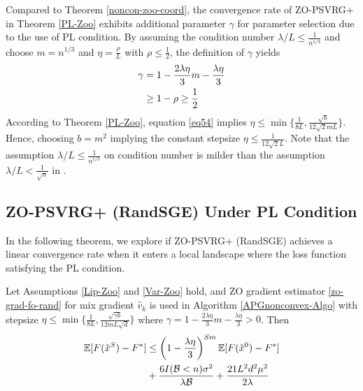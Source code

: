 \begin{remark}
Compared to Theorem \ref{noncon-zoo-coord}, the convergence rate of ZO-PSVRG+ in Theorem \ref{PL-Zoo} exhibits additional parameter $\gamma$ for parameter selection due to the use of PL condition. 
By assuming the condition number $\lambda/L\leq \frac{1}{n^{1/3}}$ and choose $m = n^{1/3}$ and $\eta = \frac{\rho}{L}$ with $\rho\leq \frac{1}{2}$, the definition of $\gamma$ yields  
\begin{align}
\gamma &= 1-\frac{2\lambda\eta}{3} m-\frac{\lambda\eta}{3}\notag \\
& \geq  1 - \rho \geq \frac{1}{2}\label{eq54}
\end{align}
According to Theorem \ref{PL-Zoo}, equation \eqref{eq54} implies $\eta \leq \min\{\frac{1}{8L}, \frac{\sqrt{b}}{12\sqrt{2} m L }\}$. 
Hence, choosing $b = m^{2}$ implying the constant stepsize  $\eta \leq \frac{1}{12\sqrt{2} L}$.
Note that the assumption $\lambda/L \leq \frac{1}{{n}^{1/3}}$ on condition number is milder than the assumption $\lambda/L < \frac{1}{\sqrt{n}}$ in \cite{reddi2016proximal}.
\end{remark}
\subsection{ZO-PSVRG+ (RandSGE) Under PL Condition}
In the following theorem, we explore if ZO-PSVRG+ (RandSGE) achieves a linear convergence rate when it enters a local landscape where the loss function satisfying the PL condition.
\begin{theorem}\label{PL-Zoo-rand}
Let Assumptions \ref{Lip-Zoo} and \ref{Var-Zoo} hold, and  ZO gradient estimator \eqref{zo-grad-fo-rand} for mix gradient $\hat{v}_k$ is used in
 Algorithm \ref{APGnonconvex-Algo} with stepsize $\eta \leq \min\{\frac{1}{8L}, \frac{\sqrt{\gamma b}}{12 m L \sqrt{d}}\}$ where $\gamma = 1-\frac{2\lambda\eta}{3} m-\frac{\lambda\eta}{3} > 0$. Then 
\begin{align}
\E[F(\tilde{x}^S) - {F}^*] & \leq   \left(1-\frac{\lambda\eta}{3}\right)^{Sm} \E[F(\tilde{x}^0) - {F}^*]\notag\\
&  + \frac{6I(\mathcal{B} < n) \sigma ^2}{\lambda\mathcal{B}}+\frac{21 L^2 d^2 \mu^2}{2\lambda}\label{PL-eq-error-rand}
\end{align}
\end{theorem}

